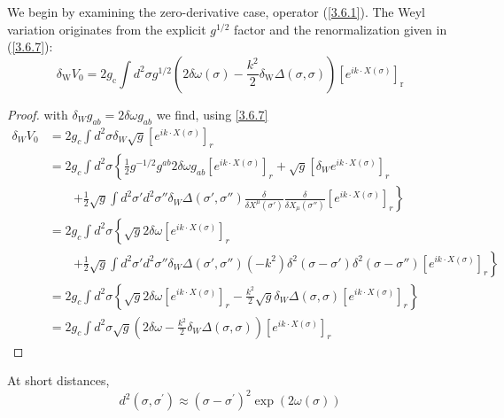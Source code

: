We begin by examining the zero-derivative case, operator (\ref{3.6.1}). The Weyl variation originates from the explicit $g^{1/2}$ factor and the renormalization given in (\ref{3.6.7}):
\begin{equation}\label{3.6.8}
	\delta_{\mathrm{W}} V_{0}=2 g_{\mathrm{c}} \int d^{2} \sigma g^{1 / 2}\left(2 \delta \omega(\sigma)-\frac{k^{2}}{2} \delta_{\mathrm{W}} \Delta(\sigma, \sigma)\right)\left[e^{i k \cdot X(\sigma)}\right]_{\mathrm{r}}
\end{equation}

\begin{tcolorbox}[breakable]
	\begin{proof}
		with \(\delta_W g_{ab} = 2\delta \omega g_{ab}\) we find, using \eqref{3.6.7}
			\begin{align}
				\delta_W V_0 &= 2g_c \int d^2 \sigma \delta_W \sqrt{g} \left[ e^{ik \cdot X(\sigma)} \right]_r\nonumber \\
				&= 2g_c \int d^2 \sigma \left\{ \frac{1}{2} g^{-1/2} g^{ab} 2\delta \omega g_{ab} \left[ e^{ik \cdot X(\sigma)} \right]_r + \sqrt{g} \left[ \delta_W e^{ik \cdot X(\sigma)} \right]_r \right. \nonumber\\
				&\qquad \left. + \frac{1}{2} \sqrt{g} \int d^2 \sigma' d^2 \sigma'' \delta_W \Delta(\sigma', \sigma'') \frac{\delta}{\delta X^\mu(\sigma')} \frac{\delta}{\delta X_\mu(\sigma'')} \left[ e^{ik \cdot X(\sigma)} \right]_r \right\} \nonumber\\
				&= 2g_c \int d^2 \sigma \left\{ \sqrt{g} 2\delta \omega \left[ e^{ik \cdot X(\sigma)} \right]_r \right. \nonumber\\
				&\qquad \left. + \frac{1}{2} \sqrt{g} \int d^2 \sigma' d^2 \sigma'' \delta_W \Delta(\sigma', \sigma'') (-k^2) \delta^2 (\sigma - \sigma') \delta^2 (\sigma - \sigma'') \left[ e^{ik \cdot X(\sigma)} \right]_r \right\} \nonumber\\
				&= 2g_c \int d^2 \sigma \left\{ \sqrt{g} 2\delta \omega \left[ e^{ik \cdot X(\sigma)} \right]_r - \frac{k^2}{2} \sqrt{g} \delta_W \Delta(\sigma, \sigma) \left[ e^{ik \cdot X(\sigma)} \right]_r \right\} \nonumber\\
				&= 2g_c \int d^2 \sigma \sqrt{g} \left( 2\delta \omega - \frac{k^2}{2} \delta_W \Delta(\sigma, \sigma) \right) \left[ e^{ik \cdot X(\sigma)} \right]_r
			\end{align}
	\end{proof}
\end{tcolorbox}
At short distances,
\begin{equation}
	d^{2}\left(\sigma, \sigma^{\prime}\right) \approx\left(\sigma-\sigma^{\prime}\right)^{2} \exp (2 \omega(\sigma))
\end{equation}
